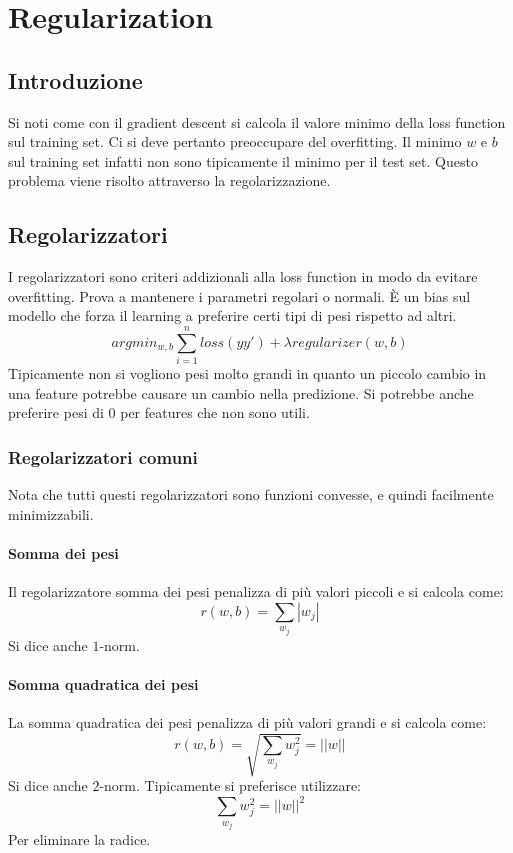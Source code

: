 \chapter{Regularization}

\section{Introduzione}
Si noti come con il gradient descent si calcola il valore minimo della loss function sul training set.
Ci si deve pertanto preoccupare del overfitting.
Il minimo $w$ e $b$ sul training set infatti non sono tipicamente il minimo per il test set.
Questo problema viene risolto attraverso la regolarizzazione.

\section{Regolarizzatori}
I regolarizzatori sono criteri addizionali alla loss function in modo da evitare overfitting.
Prova a mantenere i parametri regolari o normali.
\`E un bias sul modello che forza il learning a preferire certi tipi di pesi rispetto ad altri.
$$argmin_{w,b}\sum\limits_{i=1}^nloss(yy')+\lambda regularizer(w,b)$$
Tipicamente non si vogliono pesi molto grandi in quanto un piccolo cambio in una feature potrebbe causare un cambio nella predizione.
Si potrebbe anche preferire pesi di $0$ per features che non sono utili.

	\subsection{Regolarizzatori comuni}
	Nota che tutti questi regolarizzatori sono funzioni convesse, e quindi facilmente minimizzabili.
		\subsubsection{Somma dei pesi}
		Il regolarizzatore somma dei pesi penalizza di pi\`u valori piccoli e si calcola come:
		$$r(w,b)=\sum\limits_{w_j}|w_j|$$
		Si dice anche $1$-norm.
		
		\subsubsection{Somma quadratica dei pesi}
		La somma quadratica dei pesi penalizza di pi\`u valori grandi e si calcola come:
		$$r(w,b)=\sqrt{\sum\limits_{w_j}w_j^2} =||w||$$
		Si dice anche $2$-norm. 
		Tipicamente si preferisce utilizzare:
		$$\sum\limits_{w_j}w_j^2 =||w||^2$$
		Per eliminare la radice.
		
